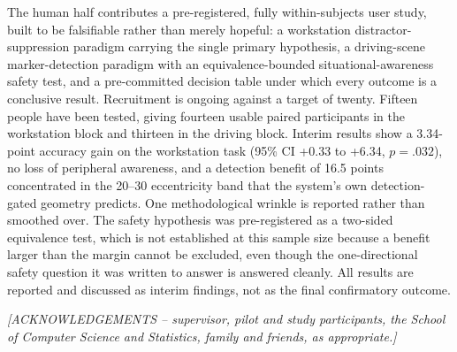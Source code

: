 \documentclass[a4paper, 12pt, oneside]{report}
\begin{document}
\begin{thesisabstract}
The human half contributes a pre-registered, fully within-subjects user study, built to be
falsifiable rather than merely hopeful: a workstation distractor-suppression paradigm carrying the
single primary hypothesis, a driving-scene marker-detection paradigm with an equivalence-bounded
situational-awareness safety test, and a pre-committed decision table under which every outcome is a
conclusive result. Recruitment is ongoing against a target of twenty. Fifteen people have been
tested, giving fourteen usable paired participants in the workstation block and thirteen in the
driving block. Interim results show a 3.34-point accuracy gain on the workstation task (95\% CI +0.33
to +6.34, $p = .032$), no loss of peripheral awareness, and a detection benefit of 16.5 points
concentrated in the 20--30\textdegree{} eccentricity band that the system's own detection-gated
geometry predicts. One methodological wrinkle is reported rather than smoothed over.
The safety hypothesis was pre-registered as a two-sided equivalence test, which is not established at
this sample size because a benefit larger than the margin cannot be excluded, even though the
one-directional safety question it was written to answer is answered cleanly. All results are
reported and discussed as interim findings, not as the final confirmatory outcome.
\end{thesisabstract}

\begin{thesisacknowledgments}
\textit{[ACKNOWLEDGEMENTS -- supervisor, pilot and study participants, the School of Computer Science
and Statistics, family and friends, as appropriate.]}
\end{thesisacknowledgments}

\tableofcontents
\listoftables
\listoffigures













\begin{appendix}

\end{appendix}
\end{document}
